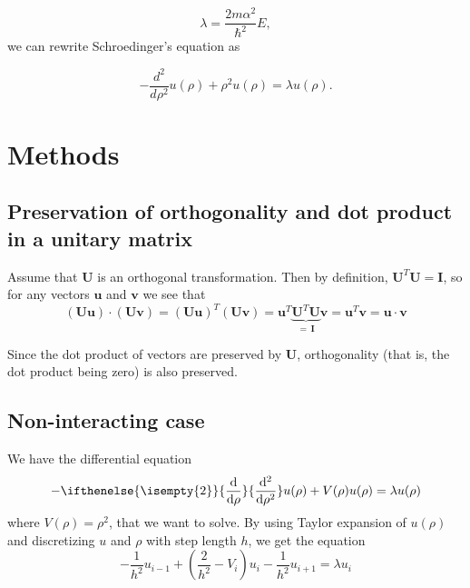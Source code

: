 \documentclass[11pt,a4paper]{article}
\newcommand\V[1]{\mathbf{#1}}                  %
\newcommand\df[3][]{{%
  \ifthenelse{\isempty{#1}}%
    {\frac{\mathrm{d}{#2}}{\mathrm{d}{#3}}}%
    {\frac{\mathrm{d}^{#1}{#2}}{{\mathrm{d}{#3}^{#1}}}}%
}}
\begin{document}
\begin{equation}
\lambda = \frac{2m\alpha^2}{\hbar^2}E,
\end{equation}
we can rewrite Schroedinger's equation as

\begin{equation}
  -\frac{d^2}{d\rho^2} u(\rho) + \rho^2u(\rho)  = \lambda u(\rho).
\end{equation}

\section{Methods}

\subsection{Preservation of orthogonality and dot product in a unitary matrix}

Assume that $\V{U}$ is an orthogonal transformation. Then by definition, $\V{U}^T \V{U} = \V{I}$,
so for any vectors $\V{u}$ and $\V{v}$ we see that
\begin{equation}
  \left( \V{U} \V{u} \right) \cdot \left( \V{U} \V{v} \right)
    = \left( \V{U} \V{u} \right)^T \left( \V{U} \V{v} \right)
    = \V{u}^T \underbrace{\V{U}^T \V{U}}_{= \, \V{I}} \V{v}
    = \V{u}^T \V{v} = \V{u} \cdot \V{v}
\end{equation}

Since the dot product of vectors are preserved by $\V{U}$, orthogonality (that is, the dot product
being zero) is also preserved.

\subsection{Non-interacting case}

We have the differential equation
\begin{equation}
  - \df[2]{}{\rho} u(\rho) + V(\rho) u(\rho) = \lambda u(\rho)
\end{equation}
where $V(\rho) = \rho^2$, that we want to solve. By using Taylor expansion of $u(\rho)$ and discretizing $u$ and $\rho$ with step length $h$, we
get the equation
\begin{equation}
  - \frac{1}{h^2} u_{i-1} + \left( \frac{2}{h^2} - V_i \right) u_i - \frac{1}{h^2} u_{i+1} = \lambda u_i
\end{equation}
\end{document}
